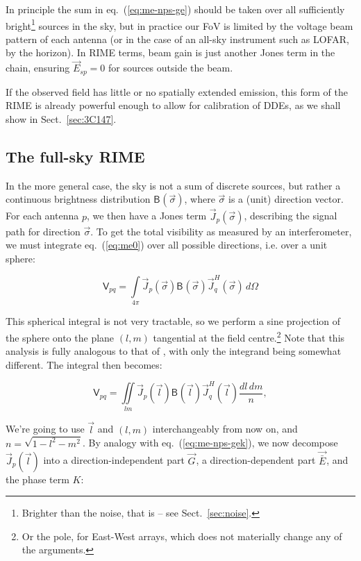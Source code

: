 \documentclass[]{aa}
\newcommand{\herm}{H}
\newcommand{\jones}[2]{\vec {#1}_{#2}}
\newcommand{\jonesT}[2]{\vec {#1}^{\herm}_{#2}}
\newcommand{\coh}[2]{\mathsf{{#1}}_{{#2}}}
\begin{document}
In principle the sum in eq.~(\ref{eq:me-nps-ge}) should be taken over all sufficiently bright\footnote{Brighter than the noise, that is -- see Sect.~\ref{sec:noise}.} sources in the sky, but in practice our FoV is limited by the voltage beam pattern of each antenna (or in the case of an all-sky instrument such as LOFAR, by the horizon). In RIME terms, beam gain is just another Jones term in the chain, ensuring $\jones{E}{sp}=0$ for sources outside the beam.

If the observed field has little or no spatially extended emission, this form of the RIME is already powerful enough to allow for calibration of DDEs, as we shall show in Sect.~\ref{sec:3C147}.

\subsection{The full-sky RIME\label{sec:full-sky-rime}}

In the more general case, the sky is not a sum of discrete sources, but rather a continuous brightness distribution $\coh{B}{}(\vec\sigma)$, where $\vec\sigma$ is a (unit) direction vector. For each antenna $p$, we then have a Jones term $\jones{J}{p}(\vec\sigma)$, describing the signal path for direction $\vec\sigma$. To get the total visibility as measured by an interferometer, we must integrate eq.~(\ref{eq:me0}) over all possible directions, i.e. over a unit sphere:

\[
\coh{V}{pq} = \int\limits_{4\pi} \jones{J}{p}(\vec\sigma) \coh{B}{}(\vec\sigma) \jonesT{J}{q}(\vec\sigma) \, d\Omega
\]

This spherical integral is not very tractable, so we perform a sine projection of the sphere onto the plane $(l,m)$ 
tangential at the field centre.\footnote{Or the pole, for East-West arrays, which does not materially change any of the arguments.} Note that this analysis is fully analogous to that of \citet[Sect.~3.1]{tms}, with only the integrand being somewhat different.  The integral then becomes:

\[
\coh{V}{pq} = \iint\limits_{lm} \jones{J}{p}(\vec l) \coh{B}{}(\vec l) \jonesT{J}{q}(\vec l) \frac{dl\,dm}{n},
\]

We're going to use $\vec l$ and $(l,m)$ interchangeably from now on, and $n=\sqrt{1-l^2-m^2}$. By analogy with eq.~(\ref{eq:me-nps-gek}), we now decompose $\jones{J}{p}(\vec l)$ into a direction-independent part $\jones{G}{}$, a direction-dependent part $\jones{\bar E}{}$, and the phase term $K$:
\end{document}
